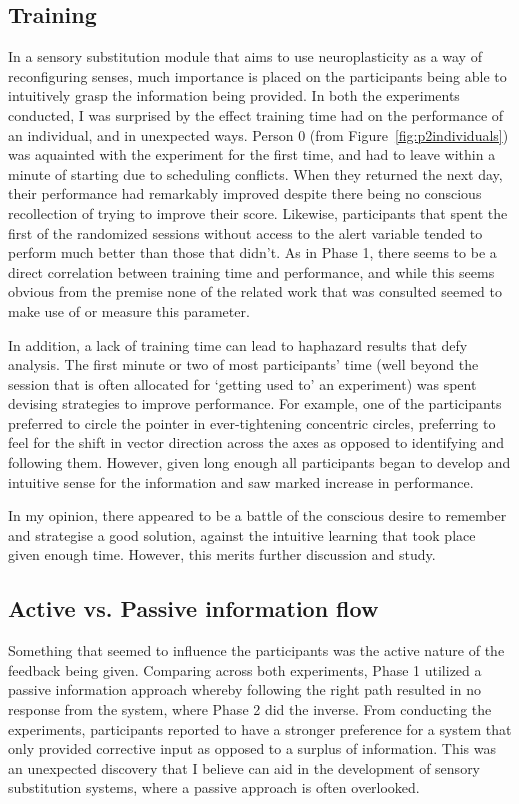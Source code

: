 \documentclass[
12pt, %
oneside, %
english, %
doublespacing, %
headsepline, %
]{MastersDoctoralThesis} %
\begin{document}
\subsection{Training}

In a sensory substitution module that aims to use neuroplasticity as a way of reconfiguring senses, much importance is placed on the participants being able to intuitively grasp the information being provided. In both the experiments conducted, I was surprised by the effect training time had on the performance of an individual, and in unexpected ways. Person 0 (from Figure~\ref{fig:p2individuals}) was aquainted with the experiment for the first time, and had to leave within a minute of starting due to scheduling conflicts. When they returned the next day, their performance had remarkably improved despite there being no conscious recollection of trying to improve their score. Likewise, participants that spent the first of the randomized sessions without access to the alert variable tended to perform much better than those that didn't. As in Phase 1, there seems to be a direct correlation between training time and performance, and while this seems obvious from the premise none of the related work that was consulted seemed to make use of or measure this parameter.

In addition, a lack of training time can lead to haphazard results that defy analysis. The first minute or two of most participants' time (well beyond the session that is often allocated for `getting used to' an experiment) was spent devising strategies to improve performance. For example, one of the participants preferred to circle the pointer in ever-tightening concentric circles, preferring to feel for the shift in vector direction across the axes as opposed to identifying and following them. However, given long enough all participants began to develop and intuitive sense for the information and saw marked increase in performance.

In my opinion, there appeared to be a battle of the conscious desire to remember and strategise a good solution, against the intuitive learning that took place given enough time. However, this merits further discussion and study.

\subsection{Active vs. Passive information flow}

Something that seemed to influence the participants was the active nature of the feedback being given. Comparing across both experiments, Phase 1 utilized a passive information approach whereby following the right path resulted in no response from the system, where Phase 2 did the inverse. From conducting the experiments, participants reported to have a stronger preference for a system that only provided corrective input as opposed to a surplus of information. This was an unexpected discovery that I believe can aid in the development of sensory substitution systems, where a passive approach is often overlooked.
\end{document}

